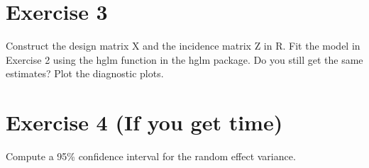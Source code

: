 \documentclass[10pt,a4paper,english]{report}
\begin{document}
\section*{Exercise 3}
Construct the design matrix X and the incidence matrix Z in R.
\newline
Fit the model in Exercise 2 using the hglm function in the hglm package. Do you still get the same estimates?
\newline
Plot the diagnostic plots.

\section*{Exercise 4 (If you get time)}
Compute a 95\% confidence interval for the random effect variance.
\end{document}
